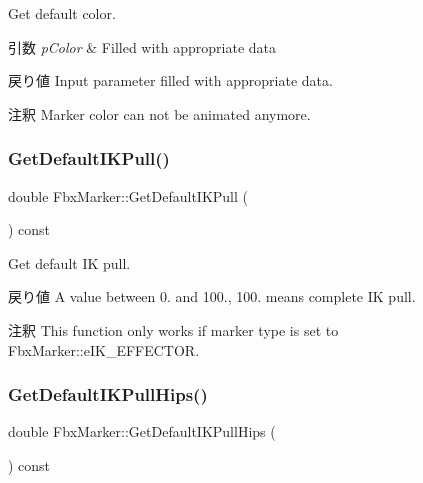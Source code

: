 Get default color. 
\begin{DoxyParams}{引数}
{\em p\+Color} & Filled with appropriate data \\
\hline
\end{DoxyParams}
\begin{DoxyReturn}{戻り値}
Input parameter filled with appropriate data. 
\end{DoxyReturn}
\begin{DoxyRemark}{注釈}
Marker color can not be animated anymore. 
\end{DoxyRemark}
\mbox{\label{class_fbx_marker_a9645132df40683ea426067e7e759f15d}} 
\subsubsection{\texorpdfstring{Get\+Default\+I\+K\+Pull()}{GetDefaultIKPull()}}
{\footnotesize\ttfamily double Fbx\+Marker\+::\+Get\+Default\+I\+K\+Pull (\begin{DoxyParamCaption}{ }\end{DoxyParamCaption}) const}

Get default IK pull. \begin{DoxyReturn}{戻り値}
A value between 0. and 100., 100. means complete IK pull. 
\end{DoxyReturn}
\begin{DoxyRemark}{注釈}
This function only works if marker type is set to Fbx\+Marker\+::e\+I\+K\+\_\+\+E\+F\+F\+E\+C\+T\+OR. 
\end{DoxyRemark}
\mbox{\label{class_fbx_marker_a33fe081159e8fbe073fbbd51a7824b94}} 
\subsubsection{\texorpdfstring{Get\+Default\+I\+K\+Pull\+Hips()}{GetDefaultIKPullHips()}}
{\footnotesize\ttfamily double Fbx\+Marker\+::\+Get\+Default\+I\+K\+Pull\+Hips (\begin{DoxyParamCaption}{ }\end{DoxyParamCaption}) const}

